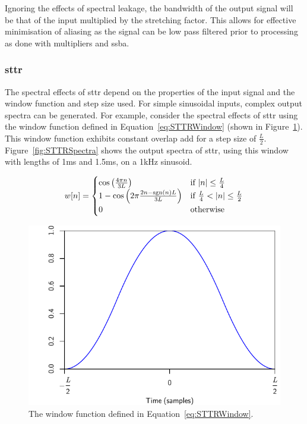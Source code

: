			Ignoring the effects of spectral leakage, the bandwidth of the output signal will be that of the
			input multiplied by the stretching factor. This allows for effective minimisation of aliasing as
			the signal can be low pass filtered prior to processing as done with multipliers and
			\acrshort{ssba}.
		
		\subsubsection*{\acrshort{sttr}}
			The spectral effects of \acrshort{sttr} depend on the properties of the input signal and the
			window function and step size used. For simple sinusoidal inputs, complex output spectra can be
			generated. For example, consider the spectral effects of \acrshort{sttr} using the window function
			defined in Equation~\ref{eq:STTRWindow} (shown in Figure~\ref{fig:STTRWindow}). This window
			function exhibits constant overlap add for a step size of $\frac{L}{2}$.
			Figure~\ref{fig:STTRSpectra} shows the output spectra of \acrshort{sttr}, using this window with
			lengths of 1ms and 1.5ms, on a 1kHz sinusoid.

			\begin{equation}
				w[n] = \begin{cases}
					\cos \left( \frac{4\pi n}{3L} \right) & \text{if $\left|n\right| \leq \frac{L}{4} $} \\
					1 - \cos \left( 2\pi \frac{2n - \operatorname{sgn}(n)L}{3L} \right) &
						\text{if $\frac{L}{4} < \left|n\right| \leq \frac{L}{2}$} \\
					0 & \text{otherwise}
				\end{cases}
				\label{eq:STTRWindow}
			\end{equation}

			\begin{figure}[h!]
				\centering
				\includegraphics{chapter5/Images/STTRWindow.pdf}
				\caption{The window function defined in Equation~\ref{eq:STTRWindow}.}
				\label{fig:STTRWindow}
			\end{figure}

